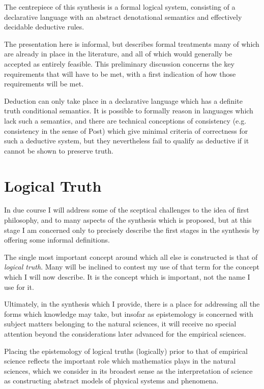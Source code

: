 \documentclass[10pt,titlepage]{book}
\begin{document}
The centrepiece of this synthesis is a formal logical system, consisting of a declarative language with an abstract denotational semantics and effectively decidable deductive rules.

The presentation here is informal, but describes formal treatments many of which are already in place in the literature, and all of which would generally be accepted as entirely feasible.
This preliminary discussion concerns the key requirements that will have to be met, with a first indication of how those requirements will be met.

Deduction can only take place in a declarative language which has a definite truth conditional semantics.
It is possible to formally reason in languages which lack such a semantics, and there are technical conceptions of consistency (e.g. consistency in the sense of Post) which give minimal criteria of correctness for such a deductive system, but they nevertheless fail to qualify as deductive if it cannot be shown to preserve truth.

\chapter{Logical Truth}

In due course I will address some of the sceptical challenges to the idea of first philosophy, and to many aspects of the synthesis which is proposed, but at this stage I am concerned only to precisely describe the first stages in the synthesis by offering some informal definitions.

The single most important concept around which all else is constructed is that of \emph{logical truth}.
Many will be inclined to contest my use of that term for the concept which I will now describe.
It is the concept which is important, not the name I use for it.

Ultimately, in the synthesis which I provide, there is a place for addressing all the forms which knowledge may take, but insofar as epistemology is concerned with subject matters belonging to the natural sciences, it will receive no special attention beyond the considerations later advanced for the empirical sciences.

Placing the epistemology of logical truths (logically) prior to that of empirical science reflects the important role which mathematics plays in the natural sciences, which we consider in its broadest sense as the interpretation of science as constructing abstract models of physical systems and phenomena.
\end{document}
